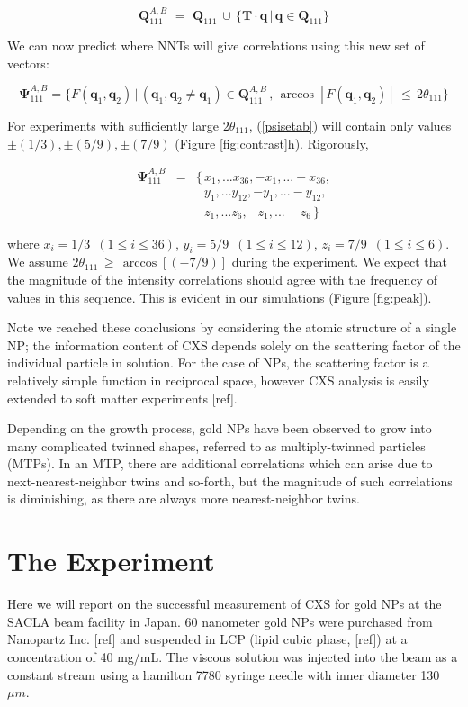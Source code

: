 \documentclass [11pt,fleqn]{article}
\def \be {\begin{equation}}
\def \ee {\end{equation}}
\def \beq {\begin{eqnarray}}
\def \eeq {\end{eqnarray}}
\begin{document}
\be
\bm Q^{A,B}_{111}\,\, =\,\, \bm Q_{111} \, \cup \, \{  \mathbf T  \cdot \bm q \, \big |\, \bm q \in \bm Q_{111} \}
\ee

We can now predict where NNTs will give correlations using this new set of vectors: 

\be \label{psisetab}
\bm \Psi^{A,B}_{111} = \{ F( \bm q_1, \bm q_2)\, \big | \, (\bm q_1, \bm q_2 \ne \bm q_1) \in \bm Q^{A,B}_{111}\, ,\,  \arccos [F( \bm q_1, \bm q_2)]  \, \le \,  2\theta_{111}     \}
\ee

For experiments with sufficiently large $2\theta_{111}$, (\ref{psisetab}) will contain only values $\pm (1/3), \pm (5/9), \pm(7/9)$ (Figure \ref{fig:contrast}h).  Rigorously, 

\beq
\bm \Psi^{A,B}_{111} &=& \{\, x_1, ... x_{36}, -x_1, ... -x_{36},  \\
&&\,\,\,\, y_1, ... y_{12}, -y_1, ... -y_{12}, \\
&& \,\,\,\, z_1, ... z_6, -z_1, ... -z_6 \, \}
\eeq

where $x_i = 1/3\,\,\, (1 \le i \le 36 )$, $y_i = 5/9\,\,\, (1 \le i \le 12 )$, $z_i = 7/9\,\,\, (1 \le i \le 6 )$.  We assume $  2\theta_{111} \, \ge \, \arccos \left[(-7/9)\right ]  $ during the experiment. We expect that the magnitude of the intensity correlations should agree with the frequency of values in this sequence. This is evident in our simulations (Figure \ref{fig:peak}).

Note we reached these conclusions by considering the atomic structure of a single NP; the information content of CXS depends solely on the scattering factor of the individual particle in solution. For the case of NPs, the scattering factor is a relatively simple function in reciprocal space, however CXS analysis is easily extended to soft matter experiments [ref].

Depending on the growth process, gold NPs have been observed to grow into many complicated twinned shapes, referred to as multiply-twinned particles (MTPs). In an MTP, there are additional correlations which can arise due to next-nearest-neighbor twins and so-forth, but the magnitude of such correlations is diminishing, as there are always more nearest-neighbor twins. 

\section{The Experiment}
Here we will report on the successful measurement of CXS for gold NPs at the SACLA beam facility in Japan. 60 nanometer gold NPs were purchased from Nanopartz Inc. [ref] and suspended in LCP (lipid cubic phase, [ref]) at a concentration of 40 mg/mL. The viscous solution was injected into the beam as a constant stream using a  hamilton 7780 syringe needle with inner diameter 130 $\mu m$.
\end{document}
